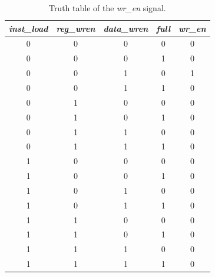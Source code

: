 \begin{table}
	\centering
	\caption{Truth table of the \textit{wr\_en} signal.}
	\label{truth_table}
	\begin{tabular}{c c c c |c}
		\hline
		\textit{inst\_load} & \textit{reg\_wren} & \textit{data\_wren} & \textit{full} & \textit{wr\_en} \\ \hline
		         0          & 0                  & 0                   & 0             & 0               \\
		         0          & 0                  & 0                   & 1             & 0               \\
		         0          & 0                  & 1                   & 0             & 1               \\
		         0          & 0                  & 1                   & 1             & 0               \\
		         0          & 1                  & 0                   & 0             & 0               \\
		         0          & 1                  & 0                   & 1             & 0               \\
		         0          & 1                  & 1                   & 0             & 0               \\
		         0          & 1                  & 1                   & 1             & 0               \\
		         1          & 0                  & 0                   & 0             & 0               \\
		         1          & 0                  & 0                   & 1             & 0               \\
		         1          & 0                  & 1                   & 0             & 0               \\
		         1          & 0                  & 1                   & 1             & 0               \\
		         1          & 1                  & 0                   & 0             & 0               \\
		         1          & 1                  & 0                   & 1             & 0               \\
		         1          & 1                  & 1                   & 0             & 0               \\
		         1          & 1                  & 1                   & 1             & 0               \\ \hline
	\end{tabular}
\end{table}
	
